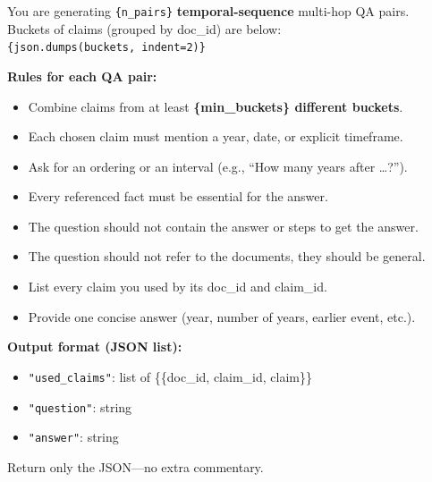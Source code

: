 \begin{tcolorbox}[
    colback=lightgray!20, 
    colframe=gray, 
    title={\textbf{Temporal-Sequence Multi-Hop QA Prompt}}, 
    fonttitle=\bfseries,
    sharp corners=southwest,
    coltitle=black,
    label=prompt:p4
]
\small

You are generating \texttt{\{n\_pairs\}} \textbf{temporal-sequence} multi-hop QA pairs. \\
Buckets of claims (grouped by doc\_id) are below: \\
\texttt{\{json.dumps(buckets, indent=2)\}}

\vspace{0.2cm}
\textbf{Rules for each QA pair:}
\begin{itemize}
    \item Combine claims from at least \textbf{\{min\_buckets\} different buckets}.
    \item Each chosen claim must mention a year, date, or explicit timeframe.
    \item Ask for an ordering or an interval (e.g., ``How many years after …?'').
    \item Every referenced fact must be essential for the answer.
    \item The question should not contain the answer or steps to get the answer.
    \item The question should not refer to the documents, they should be general.
    \item List every claim you used by its doc\_id and claim\_id.
    \item Provide one concise answer (year, number of years, earlier event, etc.).
\end{itemize}

\vspace{0.2cm}
\textbf{Output format (JSON list):}
\begin{itemize}
    \item \texttt{"used\_claims"}: list of \{\{doc\_id, claim\_id, claim\}\}
    \item \texttt{"question"}: string
    \item \texttt{"answer"}: string
\end{itemize}

Return only the JSON—no extra commentary.

\end{tcolorbox}

